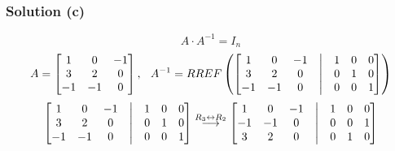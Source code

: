 \documentclass[12pt]{article}
\begin{document}
\subsubsection*{Solution (c)}
\[
  A \cdot A^{-1} = I_{n}
\]
\[
  A = 
  \begin{bmatrix}
    1 & 0 & -1\\ 
    3 & 2 & 0\\ 
    -1 & -1 & 0 
  \end{bmatrix}, \hspace{0.1in}
  A^{-1} = RREF\left(
    \begin{bmatrix}
      1 & 0 & -1 & \bigm| & 1 & 0 & 0\\ 
      3 & 2 & 0 & \bigm| & 0 & 1 & 0\\ 
      -1 & -1 & 0 & \bigm| & 0 & 0 & 1 
    \end{bmatrix}\right)
\]
\[
  \begin{bmatrix}
    1 & 0 & -1 & \bigm| & 1 & 0 & 0\\ 
    3 & 2 & 0 & \bigm| & 0 & 1 & 0\\ 
    -1 & -1 & 0 & \bigm| & 0 & 0 & 1 
  \end{bmatrix}
  \overset{R_3 \leftrightarrow R_2}{\longrightarrow}
  \begin{bmatrix}
    1 & 0 & -1 & \bigm| & 1 & 0 & 0\\ 
    -1 & -1 & 0 & \bigm| & 0 & 0 & 1\\ 
    3 & 2 & 0 & \bigm| & 0 & 1 & 0 
  \end{bmatrix}
\]
\end{document}
